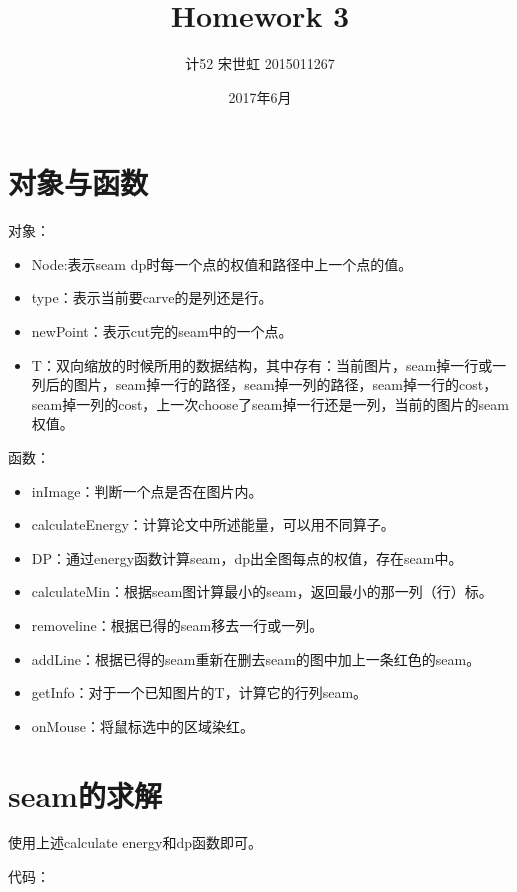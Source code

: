 \documentclass[10pt, a4paper]{article}
\title{Homework 3}
\author{计52 宋世虹 2015011267}
\date{2017年6月}
\begin{document}
	\maketitle

  \section{对象与函数}
  对象：

    \begin{itemize}
      \item Node:表示seam dp时每一个点的权值和路径中上一个点的值。
      \item type：表示当前要carve的是列还是行。
      \item newPoint：表示cut完的seam中的一个点。
      \item T：双向缩放的时候所用的数据结构，其中存有：当前图片，seam掉一行或一列后的图片，seam掉一行的路径，seam掉一列的路径，seam掉一行的cost，seam掉一列的cost，上一次choose了seam掉一行还是一列，当前的图片的seam权值。
    \end{itemize}

    函数：

    \begin{itemize}
      \item inImage：判断一个点是否在图片内。
      \item calculateEnergy：计算论文中所述能量，可以用不同算子。
      \item DP：通过energy函数计算seam，dp出全图每点的权值，存在seam中。
      \item calculateMin：根据seam图计算最小的seam，返回最小的那一列（行）标。
      \item removeline：根据已得的seam移去一行或一列。
      \item addLine：根据已得的seam重新在删去seam的图中加上一条红色的seam。
      \item getInfo：对于一个已知图片的T，计算它的行列seam。
      \item onMouse：将鼠标选中的区域染红。
    \end{itemize}
  \section{seam的求解}
    使用上述calculate energy和dp函数即可。

    代码：
\end{document}
